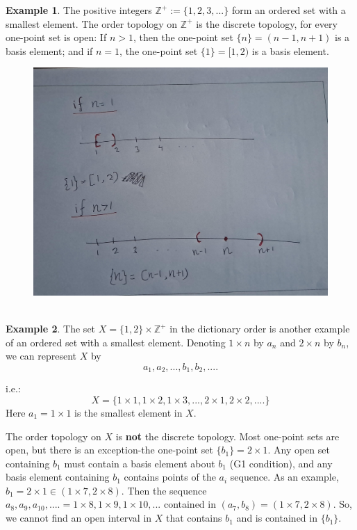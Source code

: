 \documentclass[
]{book}
\theoremstyle{definition}
\theoremstyle{definition}
\newtheorem{example}{Example}[chapter]
\theoremstyle{definition}
\theoremstyle{definition}
\theoremstyle{remark}
\begin{document}
\begin{example}
\protect\hypertarget{exm:unnamed-chunk-30}{}\label{exm:unnamed-chunk-30}The positive integers \(\mathbb{Z}^+:=\{1,2,3,...\}\) form an ordered set with a smallest element. The order topology on \(\mathbb{Z}^+\) is the discrete topology, for every one-point set is open: If \(n > 1\), then the one-point set \(\{n\} = (n - 1, n + 1)\) is a basis element; and if \(n = 1\), the one-point set \(\{1\}=[1, 2)\) is a basis element.
\end{example}

\begin{figure}
\centering
\includegraphics{figures/figure 08.jpg}
\caption{\label{fig:fig8}\(~\)}
\end{figure}

\begin{example}
\protect\hypertarget{exm:unnamed-chunk-31}{}\label{exm:unnamed-chunk-31}The set \(X = \{1, 2\} \times \mathbb{Z}^+\) in the dictionary order is another example of an ordered set with a smallest element. Denoting \(1 \times n\) by \(a_n\) and \(2 \times n\) by \(b_n\), we can represent \(X\) by
\[a_1, a_2,..., b_1, b_2,....\]

i.e.:\[X=\{1\times 1,1 \times 2, 1 \times 3, ..., 2\times 1, 2 \times 2, ....\}\]
Here \(a_1=1\times 1\) is the smallest element in \(X\).

The order topology on \(X\) is \textbf{not} the discrete topology. Most one-point sets are open, but there is an exception-the one-point set \(\{b_1\}={2\times 1}\). Any open set containing \(b_1\) must contain a basis element about \(b_1\) (G1 condition), and any basis element containing \(b_1\) contains points of the \(a_i\) sequence.
As an example, \(b_1=2\times 1\in (1\times 7,2\times 8)\). Then the sequence \(a_8,a_9,a_{10},....=1\times 8,1\times 9, 1\times 10,...\) contained in \((a_7,b_8)=(1\times 7,2\times 8)\). So, we cannot find an open interval in \(X\) that contains \(b_1\) and is contained in \(\{b_1\}\).
\end{example}
\end{document}
